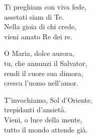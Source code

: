 
\strofa Ti preghiam con viva fede,\\
assetati siam di Te.\\
Nella gioia di chi crede,\\
vieni amato Re dei re.

\spazio


\spazio

\strofa O Maria, dolce aurora,\\
tu, che annunzi il Salvator,\\
rendi il cuore sua dimora,\\
cresca l'uomo nell'amor.

\spazio


\spazio

\strofa T'invochiamo, Sol d'Oriente,\\
trepidanti d'ansietà.\\
Vieni, o luce della mente,\\
tutto il mondo attende già.

\spazio

